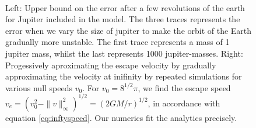 \documentclass[11pt,english,a4paper]{article}
\begin{document}
\\
\begin{figure}
% 
\caption{Left: Upper bound on the error after a few revolutions of the earth for Jupiter included in the model. The three traces represents the error when we vary the size of jupiter to make the orbit of the Earth gradually more unstable. The first trace represents a mass of 1 jupiter mass, whilst the last represents 1000 jupiter-masses. Right: Progessively aproximating the escape velocity by gradually approximating the velocity at inifinity by repeated simulations for various null speeds $v_0$. For $v_0 = 8^{1/2} \pi$, we find the escape speed $v_e = \left( v_0^2 - \|v\|_\infty^2 \right)^{1/2} = (2GM/r)^{1/2}$, in accordance with equation \ref{eq:inftyspeed}. Our numerics fit the analytics precisely.}\label{fig:escape}
\end{figure}%
\end{document}
